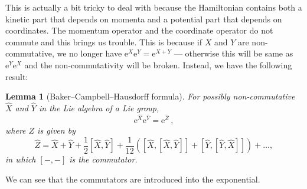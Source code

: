 \documentclass{article}
\theoremstyle{plain}\theoremheaderfont{\normalfont\itshape}\theorembodyfont{\rmfamily}\theoremseparator{.}\newtheorem*{rem}{Remark}\newtheorem*{ex}{Example}\newtheorem*{proof}{Proof}\newtheorem*{altp}{Alternative proof}
\theoremstyle{plain}\theoremheaderfont{\normalfont\bfseries}\theorembodyfont{\rmfamily}\theoremseparator{.}\newtheorem{thm}{Theorem}[section]\newtheorem{lem}[thm]{Lemma}\newtheorem{prop}[thm]{Proposition}\newtheorem*{cor}{Corollary}\newtheorem{defn}[thm]{Definition}\newtheorem{clm}[thm]{Claim}\newtheorem{clminproof}{Claim}
\theoremstyle{break}\theoremheaderfont{\normalfont\itshape}\theorembodyfont{\rmfamily}\theoremseparator{.\medskip}\newtheorem*{proofskip}{Proof}\newtheorem*{exs}{Examples}\newtheorem*{rems}{Remarks}
\theoremstyle{break}\theoremheaderfont{\normalfont\bfseries}\theorembodyfont{\rmfamily}\theoremseparator{.\medskip}\newtheorem{lemskip}[thm]{Lemma}\newtheorem{defnskip}[thm]{Definition}\newtheorem{propskip}[thm]{Proposition}\newtheorem{thmskip}[thm]{Theorem}
\numberwithin{equation}{section}
\newcommand{\ee}{\mathrm{e}}
\begin{document}
    This is actually a bit tricky to deal with because the Hamiltonian contains both a kinetic part that depends on momenta and a potential part that depends on coordinates. The momentum operator and the coordinate operator do not commute and this brings us trouble. This is because if \(X\) and \(Y\) are non-commutative, we no longer have \(\ee^{X}\ee^{Y}=\ee^{X+Y}\) --- otherwise this will be same as \(\ee^{Y}\ee^{X}\) and the non-commutativity will be broken. Instead, we have the following result:
    \begin{lem}[Baker--Campbell--Hausdorff formula]
        For possibly non-commutative \(\hat{X}\) and \(\hat{Y}\) in the Lie algebra of a Lie group,
        \begin{equation}
            \ee^{\hat{X}}\ee^{\hat{Y}}=\ee^{\hat{Z}}\,,
        \end{equation}
        where \(Z\) is given by
        \begin{equation}
            \hat{Z}=\hat{X}+\hat{Y}+\frac{1}{2}[\hat{X},\hat{Y}]+\frac{1}{12}([\hat{X},[\hat{X},\hat{Y}]]+[\hat{Y},[\hat{Y},\hat{X}]])+\dots,
        \end{equation}
        in which \([-,-]\) is the commutator.
    \end{lem}
    We can see that the commutators are introduced into the exponential.
\end{document}

